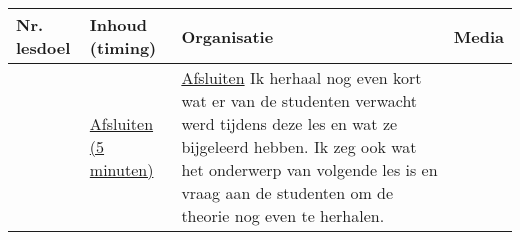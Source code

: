 \begin{landscape}
%	
	
	

\begin{tabularx}{1.56\textwidth}{|p{1.5cm}|p{6cm}|X|p{4cm}|}
	\hline
	\textbf{Nr. lesdoel } & \textbf{Inhoud (timing)}  & \textbf{Organisatie } & \textbf{Media } \\ \hline
	&\underline{Afsluiten (5 minuten)}\newline 
	&  \underline{Afsluiten}\newline
	Ik herhaal nog even kort wat er van de studenten verwacht werd tijdens deze les en wat ze bijgeleerd hebben. Ik zeg ook wat het onderwerp van volgende les is en vraag aan de studenten om de theorie nog even te herhalen.
	& 
	\\ \hline
\end{tabularx}
	
	
	
	
\end{landscape}

